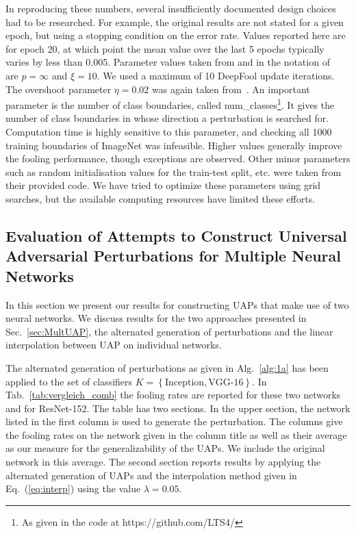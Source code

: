 \documentclass[runningheads]{llncs}
\begin{document}
In reproducing these numbers, several insufficiently documented design choices had to be researched. For example, the original results are not stated for a given epoch, but using a stopping condition on the error rate. Values reported here are for epoch 20, at which point the mean value over the last 5 epochs typically varies by less than 0.005. Parameter values taken from and in the notation of~\cite{DeepFool-Moosavi-Dezfooli15} are \(p=\infty\) and \(\xi=10\). We used a maximum of 10 DeepFool update iterations. The overshoot parameter \(\eta=0.02\) was again taken from~\cite{DeepFool-Moosavi-Dezfooli15}. 
An important parameter is the number of class boundaries, called num\_classes\footnote{As given in the code at https://github.com/LTS4/}. It gives the number of class boundaries in whose direction a perturbation is searched for. Computation time is highly sensitive to this parameter, and checking all 1000 training boundaries of ImageNet was infeasible. Higher values generally improve the fooling performance, though exceptions are observed. 
Other minor parameters such as random initialisation values for the train-test split, etc. were taken from their provided code. We have tried to optimize these parameters using grid searches, but the available computing resources have limited these efforts. 

\subsection{Evaluation of Attempts to Construct Universal Adversarial Perturbations for Multiple Neural Networks}\label{sec:EvaluationCombined}
In this section we present our results for constructing UAPs that make use of two neural networks. We discuss results for the two approaches presented in Sec.~\ref{sec:MultUAP}, the alternated generation of perturbations and the linear interpolation between UAP on individual networks.

The alternated generation of perturbations as given in Alg.~\ref{alg:1a} has been applied to the set of classifiers \(K=\left\{\text{Inception},\text{VGG-16}\right\}\). In Tab.~\ref{tab:vergleich_comb} the fooling rates are reported for these two networks and for ResNet-152. The table has two sections. In the upper section, the network listed in the first column is used to generate the perturbation. The columns give the fooling rates on the network given in the column title as well as their average as our measure for the generalizability of the UAPs. We include the original network in this average. 
The second section reports results by applying the alternated generation of UAPs and the interpolation method given in Eq.~(\ref{eq:interp}) using the value $\lambda=0.05$. 
\end{document}
